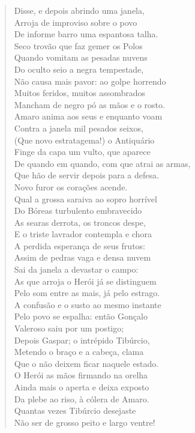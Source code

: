 \begin{verse}
Disse, e depois abrindo uma janela,\\
Arroja de improviso sobre o povo\\
De informe barro uma espantosa talha.\\
Seco trovão que faz gemer os Polos\\
Quando vomitam as pesadas nuvens\\
Do oculto seio a negra tempestade,\\
Não causa mais pavor: ao golpe horrendo\\
Muitos feridos, muitos assombrados\\
Mancham de negro pó as mãos e o rosto.\\
Amaro anima aos seus e enquanto voam\\
Contra a janela mil pesados seixos,\\
(Que novo estratagema!) o Antiquário\\
Finge da capa um vulto, que aparece\\
De quando em quando, com que atrai as armas,\\
Que hão de servir depois para a defesa. \\[10pt]


Novo furor os corações acende.\\
Qual a grossa saraiva ao sopro horrível\\
Do Bóreas turbulento embravecido\\		\index{\Borea}
As searas derrota, os troncos despe,\\
E o triste lavrador contempla e chora\\
A perdida esperança de seus frutos:\\
Assim de pedras vaga e densa nuvem\\
Sai da janela a devastar o campo:\\
As que arroja o Herói já se distinguem\\
Pelo som entre as mais, já pelo estrago.\\
A confusão e o susto ao mesmo instante\\
Pelo povo se espalha: então Gonçalo\\
Valeroso saiu por um postigo;\\
Depois Gaspar; o intrépido Tibúrcio,\\
Metendo o braço e a cabeça, clama\\
Que o não deixem ficar naquele estado.\\
O Herói as mãos firmando na orelha\\
Ainda mais o aperta e deixa exposto\\
Da plebe ao riso, à cólera de Amaro.\\
Quantas vezes Tibúrcio desejaste\\
Não ser de grosso peito e largo ventre! \\[10pt]



\end{verse}
